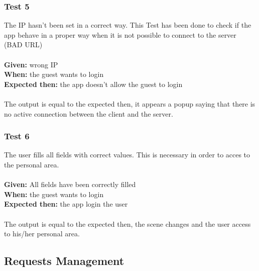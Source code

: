 \subsubsection{\Large{Test 5}}
The IP hasn't been set in a correct way. This Test has been done to check if the app behave in a proper way when it is not possible to connect to the server (BAD URL)\\
\\
\textbf{Given: } wrong IP\\
\textbf{When: } the guest wants to login\\
\textbf{Expected then: } the app doesn't allow the guest to login\\
\\
The output is equal to the expected then, it appears a popup saying that there is no active connection between the client and the server.

\subsubsection{\Large{Test 6}}
The user fills all fields with correct values. This is necessary in order to acces to the personal area.\\
\\
\textbf{Given: } All fields have been correctly filled\\
\textbf{When: } the guest wants to login\\
\textbf{Expected then: } the app login the user\\
\\
The output is equal to the expected then, the scene changes and the user access to his/her personal area.

\subsection{Requests Management}

